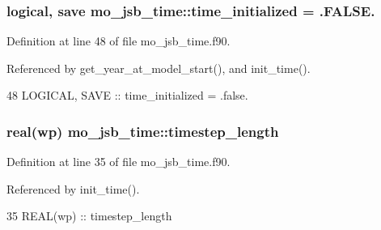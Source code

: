 \subsubsection[{time\+\_\+initialized}]{\setlength{\rightskip}{0pt plus 5cm}logical, save mo\+\_\+jsb\+\_\+time\+::time\+\_\+initialized = .F\+A\+L\+S\+E.}\label{namespacemo__jsb__time_ac404f6055d48b37e7de92b0e288f5a8c}


Definition at line 48 of file mo\+\_\+jsb\+\_\+time.\+f90.



Referenced by get\+\_\+year\+\_\+at\+\_\+model\+\_\+start(), and init\+\_\+time().


\begin{DoxyCode}
48   \textcolor{keywordtype}{LOGICAL}, \textcolor{keywordtype}{SAVE} :: time\_initialized = .false.
\end{DoxyCode}
\hypertarget{namespacemo__jsb__time_ad760ff14bc3e4b8e9d624706973ee1a4}{}
\subsubsection[{timestep\+\_\+length}]{\setlength{\rightskip}{0pt plus 5cm}real(wp) mo\+\_\+jsb\+\_\+time\+::timestep\+\_\+length}\label{namespacemo__jsb__time_ad760ff14bc3e4b8e9d624706973ee1a4}


Definition at line 35 of file mo\+\_\+jsb\+\_\+time.\+f90.



Referenced by init\+\_\+time().


\begin{DoxyCode}
35   \textcolor{keywordtype}{REAL(wp)}               :: timestep\_length
\end{DoxyCode}
